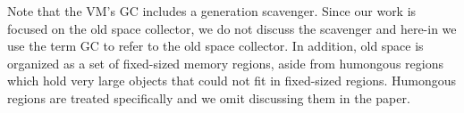 \documentclass[sigplan,10pt,screen]{acmart}\settopmatter{printfolios=true,printccs=true,printacmref=true}
\def\OpenSmalltalkVM{OpenSmalltalk-VM\xspace}
\def\ie{\emph{i.e., }}
\begin{document}
Note that the VM's GC includes a generation scavenger. Since our work is focused on the old space collector, we do not discuss the scavenger and here-in we use the term GC to refer to the old space collector. In addition, old space is organized as a set of fixed-sized memory regions, aside from humongous regions which hold very large objects that could not fit in fixed-sized regions. Humongous regions are treated specifically and we omit discussing them in the paper.


%
\end{document}
